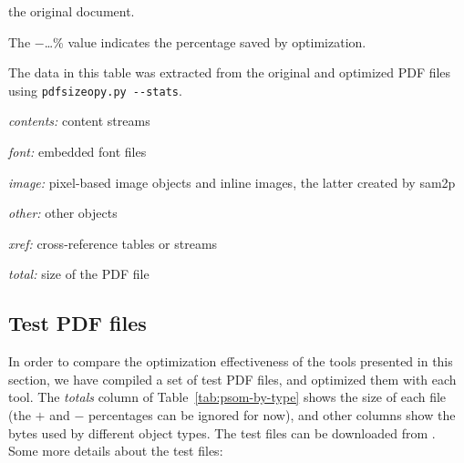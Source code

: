 \documentclass{ltugproc}
\def\cmd{\textsf}
\begin{document}
\begin{table*}
the original document.
\par\noindent The $-$\ldots\% value indicates the percentage saved by
optimization.
\par\noindent The data in this table was extracted from the original and
optimized PDF files using \texttt{pdfsizeopy.py -\hbox{-}stats}.
\medskip
\par\noindent \emph{contents:} content streams
\par\noindent \emph{font:} embedded font files
\par\noindent \emph{image:} pixel-based image objects and inline images, the latter
created by \cmd{sam2p}
\par\noindent \emph{other:} other objects
\par\noindent \emph{xref:} cross-reference tables or streams
\par\noindent \emph{total:} size of the PDF file
\end{table*}

\subsection{Test PDF files}

In order to compare the optimization effectiveness of the tools presented in
this section, we have compiled a set of test PDF files, and optimized them
with each tool. The \emph{totals} column of Table~\ref{tab:psom-by-type} shows
the size of each file (the $+$ and $-$ percentages can be ignored for now), and
other columns show the bytes used by different object types. The test files
can be downloaded from \cite{example-pdfs}. Some more
details about the test files:
\end{document}
